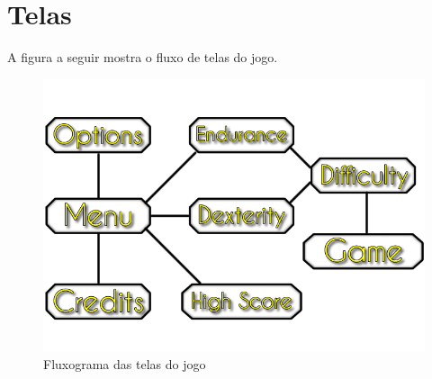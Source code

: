 \section{Telas} 

A figura a seguir mostra o fluxo de \hypertarget{Telas}{telas} do jogo.

\begin{figure}[H]
\centering\includegraphics[scale=2.0]{figuras/fluxo_telas.png}
\caption{Fluxograma das telas do jogo}
\end{figure}

